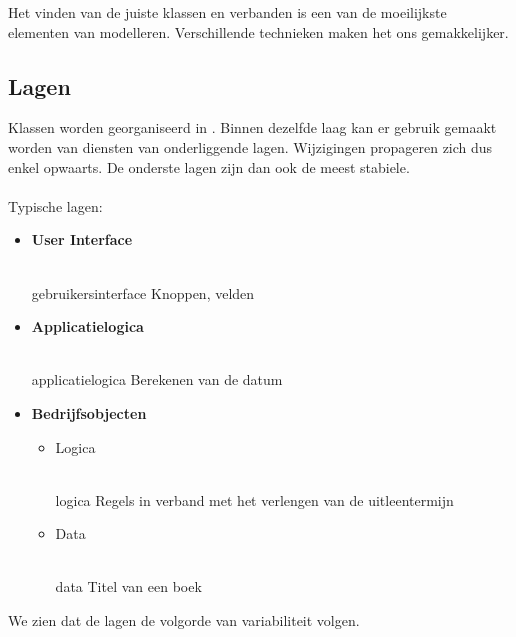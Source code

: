 \documentclass[../../main.tex]{subfiles}
\begin{document}
Het vinden van de juiste klassen en verbanden is een van de moeilijkste elementen van modelleren. Verschillende technieken maken het ons gemakkelijker.
\subsection{Lagen}
Klassen worden georganiseerd in . Binnen dezelfde laag kan er gebruik gemaakt worden van diensten van onderliggende lagen. Wijzigingen propageren zich dus enkel opwaarts. De onderste lagen zijn dan ook de meest stabiele.\\
\\
Typische lagen:
\begin{itemize}
	\item \textbf{User Interface} \\
	\\
	\begin{ex}{gebruikersinterface}
	Knoppen, velden
	\end{ex}
	\item \textbf{Applicatielogica}\\
	\\
	\begin{ex}{applicatielogica}
	Berekenen van de datum
	\end{ex}
	\item \textbf{Bedrijfsobjecten}
	\begin{itemize}
		\item Logica\\
		\\
		\begin{ex}{logica}
		Regels in verband met het verlengen van de uitleentermijn
		\end{ex}
		\item Data\\
		\\
		\begin{ex}{data}
		Titel van een boek
		\end{ex}
	\end{itemize}
\end{itemize}
We zien dat de lagen de volgorde van variabiliteit volgen.
\end{document}
